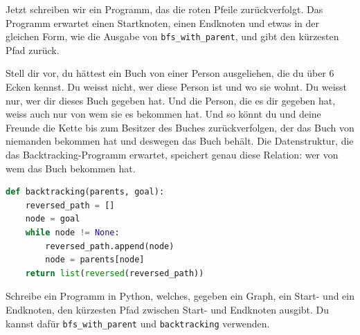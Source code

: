 Jetzt schreiben wir ein Programm, das die roten Pfeile zurückverfolgt. Das Programm erwartet einen Startknoten, einen Endknoten und etwas in der gleichen Form, wie die Ausgabe von \texttt{bfs\_with\_parent}, und gibt den kürzesten Pfad zurück.
 
Stell dir vor, du hättest ein Buch von einer Person ausgeliehen, die du über 6 Ecken kennst. Du weisst nicht, wer diese Person ist und wo sie wohnt. Du weisst nur, wer dir dieses Buch gegeben hat. Und die Person, die es dir gegeben hat, weiss auch nur von wem sie es bekommen hat. Und so könnt du und deine Freunde die Kette bis zum Besitzer des Buches zurückverfolgen, der das Buch von niemanden bekommen hat und deswegen das Buch behält. Die Datenstruktur, die das Backtracking-Programm erwartet, speichert genau diese Relation: wer von wem das Buch bekommen hat.

\begin{lstlisting}[language=Python, caption={Programm, welches rote Pfeile zurückverfolgt}, label={backtracking}]
def backtracking(parents, goal):
    reversed_path = []
    node = goal
    while node != None:
        reversed_path.append(node)
        node = parents[node]
    return list(reversed(reversed_path))
\end{lstlisting}

\begin{aufgabe}\label{aufgabe_shortest_path}
Schreibe ein Programm in Python, welches, gegeben ein Graph, ein Start- und ein Endknoten, den kürzesten Pfad zwischen Start- und Endknoten ausgibt. Du kannst dafür \texttt{bfs\_with\_parent} und \texttt{backtracking} verwenden.
\end{aufgabe}

